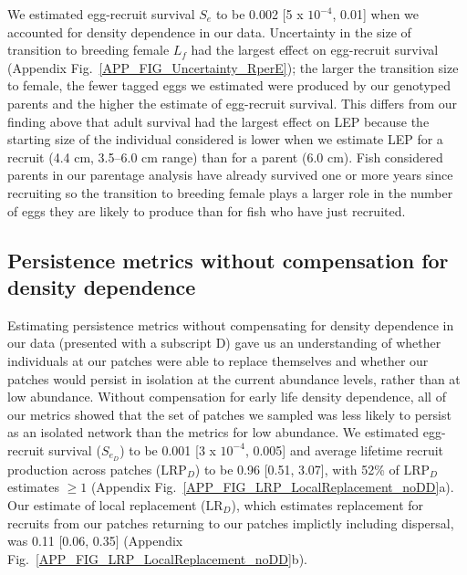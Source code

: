 \documentclass[12pt, oneside]{article}   	%
\begin{document}
We estimated egg-recruit survival $S_{e}$ to be 0.002 [5 x $10^{-4}$, 0.01] when we accounted for density dependence in our data. Uncertainty in the size of transition to breeding female $L_f$ had the largest effect on egg-recruit survival (Appendix Fig.\ \ref{APP_FIG_Uncertainty_RperE}); the larger the transition size to female, the fewer tagged eggs we estimated were produced by our genotyped parents and the higher the estimate of egg-recruit survival. This differs from our finding above that adult survival had the largest effect on LEP because the starting size of the individual considered is lower when we estimate LEP for a recruit (4.4 cm, 3.5--6.0 cm range) than for a parent (6.0 cm). Fish considered parents in our parentage analysis have already survived one or more years since recruiting so the transition to breeding female plays a larger role in the number of eggs they are likely to produce than for fish who have just recruited. 



\subsection{Persistence metrics without compensation for density dependence} \label{APP_SEC_RESULTS_noDD} %
Estimating persistence metrics without compensating for density dependence in our data (presented with a subscript D) gave us an understanding of whether individuals at our patches were able to replace themselves and whether our patches would persist in isolation at the current abundance levels, rather than at low abundance. Without compensation for early life density dependence, all of our metrics showed that the set of patches we sampled was less likely to persist as an isolated network than the metrics for low abundance. We estimated egg-recruit survival ($S_{e_{D}}$) to be 0.001 [3 x $10^{-4}$, 0.005] and average lifetime recruit production across patches ($\text{LRP}_{D}$) to be 0.96 [0.51, 3.07], with 52\% of $\text{LRP}_{D}$ estimates $\geq 1$ (Appendix Fig.\ \ref{APP_FIG_LRP_LocalReplacement_noDD}a). Our estimate of local replacement ($\text{LR}_{D}$), which estimates replacement for recruits from our patches returning to our patches implictly including dispersal, was 0.11 [0.06, 0.35] (Appendix Fig.\ \ref{APP_FIG_LRP_LocalReplacement_noDD}b). 
\end{document}
